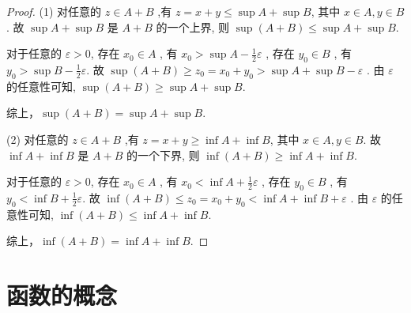 \begin{proof}
    (1) \biyao 对任意的 $z\in A+B$ ,有 $z=x+y \le \sup A + \sup B $, 其中 $x\in A,y\in B$. 故 $\sup A + \sup B$ 是 $A+B$ 的一个上界, 则 $\sup (A+B)\le \sup A + \sup B$.
    
    \chongfen 
    对于任意的 $\varepsilon>0$, 存在 $x_0\in A$ , 有 $x_0>\sup A - \frac{1}{2}\varepsilon$ , 存在 $y_0\in B$ , 有 $y_0>\sup B - \frac{1}{2}\varepsilon$. 故 $\sup(A+B) \ge z_0 = x_0+y_0>\sup A+\sup B -\varepsilon$ . 由 $\varepsilon$ 的任意性可知, $\sup(A+B) \ge \sup A+\sup B $.
    
    综上，$\sup(A+B) = \sup A+\sup B $.
    
    (2) \biyao 对任意的 $z\in A+B$ ,有 $z=x+y \ge \inf A + \inf B $, 其中 $x\in A,y\in B$. 故 $\inf A + \inf B$ 是 $A+B$ 的一个下界, 则 $\inf (A+B)\ge \inf A + \inf B$.
    
    \chongfen 
    对于任意的 $\varepsilon>0$, 存在 $x_0\in A$ , 有 $x_0<\inf A + \frac{1}{2}\varepsilon$ , 存在 $y_0\in B$ , 有 $y_0<\inf B + \frac{1}{2}\varepsilon$. 故 $\inf(A+B) \le z_0 = x_0+y_0<\inf A+\inf B +\varepsilon$ . 由 $\varepsilon$ 的任意性可知, $\inf(A+B) \le \inf A+\inf B $.
    
    综上，$\inf(A+B) = \inf A+\inf B $.
\end{proof}

\newsection

\section{函数的概念}